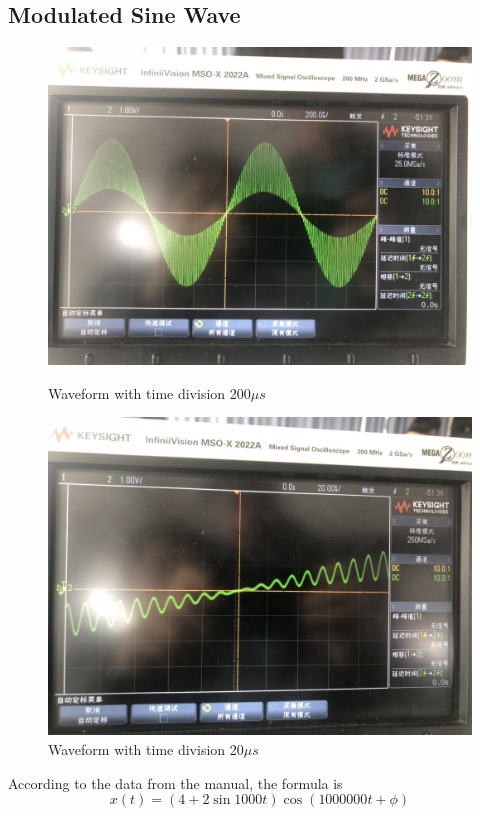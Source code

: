 \documentclass[12pt]{article}
\begin{document}
\subsection{Modulated Sine Wave}
\begin{figure}[H]
\centering
\includegraphics[scale=0.2]{P12.jpg}
\caption{Waveform with time division 200$\mu s$}
\includegraphics[scale=0.2]{P13.jpg}
\caption{Waveform with time division 20$\mu s$}
\end{figure}
According to the data from the manual, the formula is $$x(t)=(4+2\sin1000t)\cos(1000000t+\phi)$$
\end{document}
